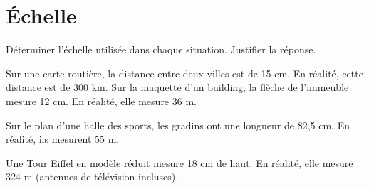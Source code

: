 
\section{\'Echelle}

Déterminer l’échelle utilisée dans chaque situation. Justifier la réponse.

\begin{questions}
	\question Sur une carte routière, la distance entre deux villes est de 15 cm. En réalité, cette distance est de 300 km.
	\question Sur la maquette d’un building, la flèche de l’immeuble mesure 12 cm. En réalité, elle mesure 36 m.
	
	\question Sur le plan d’une halle des sports, les gradins ont une longueur de 82,5 cm. En réalité, ils mesurent 55 m.
	
	\question Une Tour Eiffel en modèle réduit mesure 18 cm de haut. En réalité, elle mesure 324 m (antennes de télévision incluses).
\end{questions}

